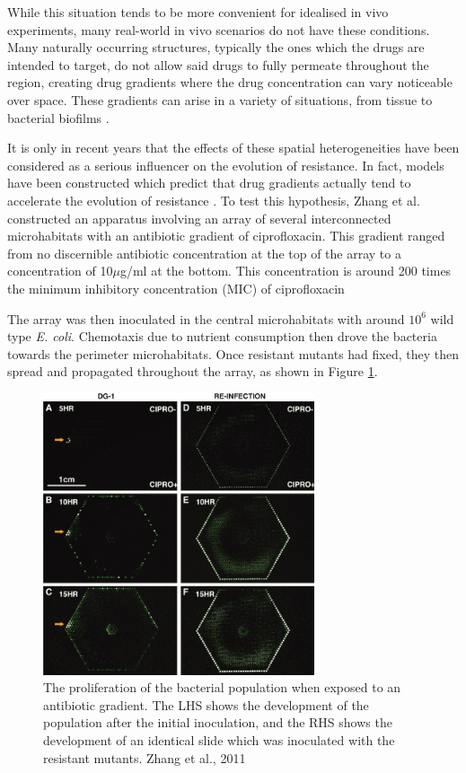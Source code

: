\documentclass[a4paper,12pt]{article}
\begin{document}
While this situation tends to be more convenient for idealised in vivo experiments, many real-world in vivo scenarios do not have these conditions.
Many naturally occurring structures, typically the ones which the drugs are intended to target, do not allow said drugs to fully permeate throughout
the region, creating drug gradients where the drug concentration can vary noticeable over space.  These gradients can arise in a variety of 
situations, from tissue \cite{bioref:minelli-peflox-penet} to bacterial biofilms \cite{bioref:Anderson2008}.

It is only in recent years that the effects of these spatial heterogeneities have been considered as a serious influencer on the evolution of resistance. 
In fact, models have been constructed which predict that drug gradients actually tend to accelerate the evolution of resistance \cite{bioref:Hermsen-source-and-sink}.
To test this hypothesis, Zhang et al. \cite{bioref:Zhang-effects-of-antibio-grad} constructed an apparatus involving an array of several interconnected microhabitats with 
an antibiotic gradient of ciprofloxacin.  This gradient ranged from no discernible antibiotic concentration at the top of the array to a concentration of 
10$\mu$g/ml at the bottom.  This concentration is around 200 times the minimum inhibitory concentration (MIC) of ciprofloxacin \cite{bioref:ciprofloxa-mic}

The array was then inoculated in the central microhabitats with around $10^6$ wild type \textit{E. coli}.  Chemotaxis due to nutrient consumption 
then drove the bacteria towards the perimeter microhabitats.  Once resistant mutants had fixed, they then spread and propagated throughout the array,
as shown in Figure \ref{fig:Zhang-gradient-apparatus}.

\begin{figure}[H]
 \centering
 \includegraphics[width=8cm]{Zhang-microhab-gradient-cropped}
 \caption{The proliferation of the bacterial population when exposed to an antibiotic gradient.  The LHS shows the development
 of the population after the initial inoculation, and the RHS shows the development of an identical slide which was 
 inoculated with the resistant mutants. Zhang et al., 2011}
 \label{fig:Zhang-gradient-apparatus}
\end{figure}
\end{document}
